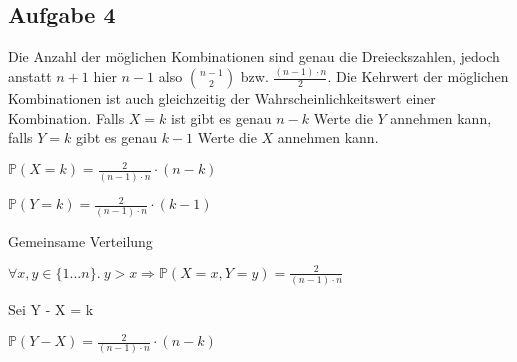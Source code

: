 \documentclass[10pt,a4paper,parskip=half]{scrartcl}
\begin{document}
\subsection*{Aufgabe 4}
Die Anzahl der möglichen Kombinationen sind genau die Dreieckszahlen, jedoch anstatt $n+1$ hier $n-1$ also $n-1 \choose 2$ bzw. $\frac{(n-1)\cdot n}{2}$. Die Kehrwert der möglichen Kombinationen ist auch gleichzeitig der Wahrscheinlichkeitswert einer Kombination. Falls $X = k$ ist gibt es genau $n - k$ Werte die $Y$ annehmen kann, falls $Y=k$ gibt es genau $k -1$ Werte die $X$ annehmen kann.
\begin{center}
$\mathbb{P}(X=k) = \frac{2}{(n-1)\cdot n} \cdot (n-k)$ \\
\end{center}
\begin{center}
$\mathbb{P}(Y=k) = \frac{2}{(n-1)\cdot n} \cdot (k-1)$ \\
\end{center}
Gemeinsame Verteilung
\begin{center}
$\forall x,y \in \{1...n\} . ~y > x \Rightarrow \mathbb{P}(X=x, Y=y) = \frac{2}{(n-1)\cdot n}$
\end{center}
Sei Y - X = k \\
\begin{center}
$\mathbb{P}(Y-X) = \frac{2}{(n-1)\cdot n} \cdot (n-k)$ \\
\end{center}
\end{document}
